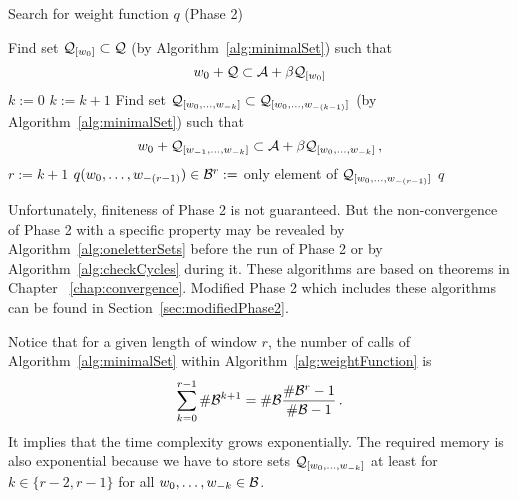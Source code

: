     
\begin{algorithm}
  \caption{Search for weight function $q$ (Phase 2)}
    \label{alg:weightFunction}
  \begin{algorithmic}[1]
        \STATE Find set $\mathcal{Q}_{[w_0]} \subset \mathcal{Q}$ (by Algorithm~\ref{alg:minimalSet}) such that
          $$
          w_0 + \mathcal{Q} \subset \mathcal{A} + \beta \mathcal{Q}_{[w_0]}
          $$
    \ENDFOR
    \STATE $k:=0$
        \STATE $k:= k +1$
            \STATE Find set $\mathcal{Q}_{[w_{0}, \dots, w_{-k}]} \subset \mathcal{Q}_{[w_{0}, \dots, w_{-(k-1)}]}$ (by Algorithm~\ref{alg:minimalSet}) such that
              $$
              w_0 + \mathcal{Q}_{[w_{-1}, \dots, w_{-k}]} \subset \mathcal{A} + \beta \mathcal{Q}_{[w_{0}, \dots, w_{-k}]}\,,
              $$
        \ENDFOR  
    \ENDWHILE  
    \STATE $r:= k+1$ 
        \STATE $q(w_{0}, \dots, w_{-(r-1)})\in \mathcal{B}^{r}:=$ only element of $\mathcal{Q}_{[w_{0}, \dots, w_{-(r-1)}]}$
    \ENDFOR
    \RETURN $q$
  \end{algorithmic}
\end{algorithm}

Unfortunately, finiteness of Phase 2 is not guaranteed. But the non-convergence of Phase 2 with a specific property may be revealed by Algorithm~\ref{alg:oneletterSets} before the run of Phase 2 or by Algorithm~\ref{alg:checkCycles} during it. These algorithms are based on theorems in Chapter ~\ref{chap:convergence}. Modified Phase 2 which includes these algorithms can be found in Section~\ref{sec:modifiedPhase2}.



Notice that for a given length of window $r$, the number of calls of Algorithm~\ref{alg:minimalSet} within Algorithm~\ref{alg:weightFunction} is
$$
\sum_{k=0}^{r-1}  \#\mathcal{B}^{k+1} = \#\mathcal{B} \frac{\#\mathcal{B}^r-1}{\#\mathcal{B}-1}\,.
$$    
It implies that the time complexity grows exponentially. The required memory is also exponential because we have to store sets $\mathcal{Q}_{[w_{0}, \dots, w_{-k}]}$ at least for $k\in\{r-2, r-1\}$  for all $w_0,\dots, w_{-k} \in \mathcal{B}$.
